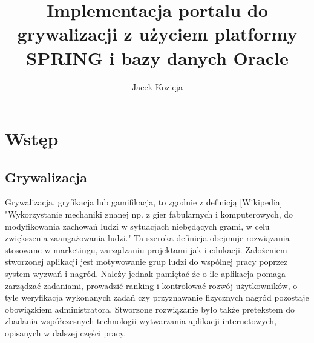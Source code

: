 \documentclass[a4paper,12pt,twoside,openany]{report}
\title{Implementacja portalu do grywalizacji z użyciem platformy SPRING i bazy danych Oracle}
\author{Jacek Kozieja}
\begin{document}
\maketitle
\chapter{Wstęp}
\section{Grywalizacja}
	Grywalizacja, gryfikacja lub gamifikacja, to zgodnie z definicją [Wikipedia] "Wykorzystanie mechaniki znanej np. z gier fabularnych i komputerowych, do modyfikowania zachowań ludzi w sytuacjach niebędących grami, w celu zwiększenia zaangażowania ludzi." Ta szeroka definicja obejmuje rozwiązania stosowane w marketingu, zarządzaniu projektami jak i edukacji. Założeniem stworzonej aplikacji jest motywowanie grup ludzi do wspólnej pracy poprzez system wyzwań i nagród. Należy jednak pamiętać że o ile aplikacja pomaga zarządzać zadaniami, prowadzić ranking i kontrolować rozwój użytkowników, o tyle weryfikacja wykonanych zadań czy przyznawanie fizycznych nagród pozostaje obowiązkiem administratora. Stworzone rozwiązanie było także pretekstem do zbadania współczesnych technologii wytwarzania aplikacji internetowych, opisanych w dalszej części pracy. 
\end{document}

